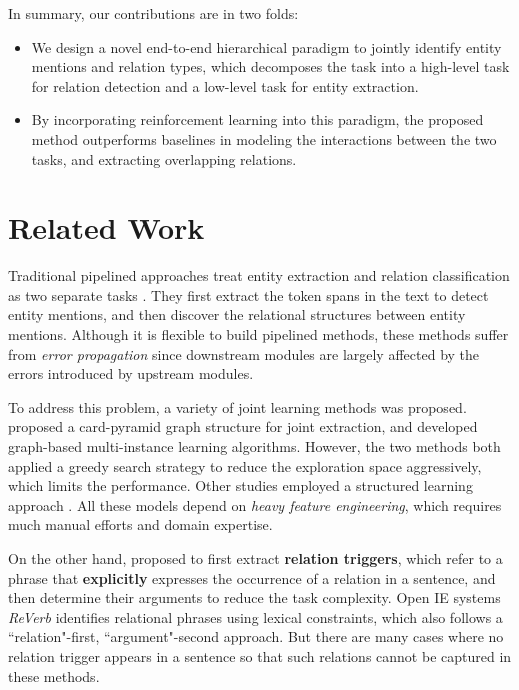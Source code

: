 \documentclass[letterpaper]{article}
\theoremstyle{definition}
\begin{document}
In summary, our contributions are in two folds:
\begin{itemize}

\item
We design a novel end-to-end hierarchical paradigm to jointly identify entity mentions and relation types, which decomposes the task into a high-level task for relation detection and a low-level task for entity extraction.

\item
By incorporating reinforcement learning into this paradigm, the proposed method outperforms baselines in modeling the interactions between the two tasks, and extracting overlapping relations.
\end{itemize}



\section{Related Work}

Traditional pipelined approaches treat entity extraction and relation classification as two separate tasks \cite{mintz2009distant,gormley2015improved,tang2015line}. They first extract the token spans in the text to detect entity mentions, and then discover the relational structures between entity mentions. Although it is flexible to build pipelined methods, these methods suffer from \textit{error propagation} since downstream modules are largely affected by the errors introduced by upstream modules.

To address this problem, a variety of joint learning methods was proposed. \citeauthor{kate2010joint}  proposed a card-pyramid graph structure for joint extraction, and \citeauthor{hoffmann2011knowledge}  developed graph-based multi-instance learning algorithms. However, the two methods both applied a greedy search strategy to reduce the exploration space aggressively, which limits the performance. Other studies employed a structured learning approach \cite{li2014incremental,miwa2014modeling}. All these models depend on \textit{heavy feature engineering}, which requires much manual efforts and domain expertise. %

On the other hand, \citeauthor{bjorne2011extracting}  proposed to first extract \textbf{relation triggers}, which refer to a phrase that \textbf{explicitly} expresses the occurrence of a relation in a sentence, and then determine their arguments to reduce the task complexity. Open IE systems \textit{ReVerb} \cite{fader2011identifying} identifies relational phrases using lexical constraints, which also follows a ``relation"-first, ``argument"-second approach. But there are many cases where no relation trigger appears in a sentence so that such relations cannot be captured in these methods.
\end{document}
